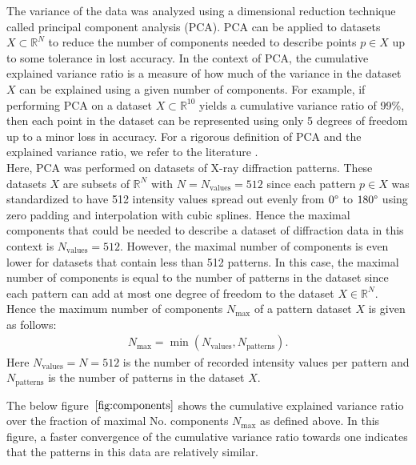 The variance of the data was analyzed using a dimensional reduction technique called principal component analysis (PCA). PCA can be applied to datasets $X \subset \mathbb{R}^N$ to reduce the number of components needed to describe points $p \in X$ up to some tolerance in lost accuracy. In the context of PCA, the cumulative explained variance ratio is a measure of how much of the variance in the dataset $X$ can be explained using a given number of components. For example, if performing PCA on a dataset $X \subset \mathbb{R}^{10}$ yields a cumulative variance ratio of 99\%, then each point in the dataset can be represented using only 5 degrees of freedom up to a minor loss in accuracy. For a rigorous definition of PCA and the explained variance ratio, we refer to the literature \cite{Jolliffe2016}. \\

Here, PCA was performed on datasets of X-ray diffraction patterns. These datasets $X$ are subsets of $\mathbb{R}^{N}$ with $N=N_{\text{values}} =512$ since each pattern $p \in X$ was standardized to have 512 intensity values spread out evenly from $0\degree$ to $180\degree$ using zero padding and interpolation with cubic splines. Hence the maximal components that could be needed to describe a dataset of diffraction data in this context is $N_{\text{values}}=512$. However, the maximal number of components is even lower for datasets that contain less than 512 patterns. In this case, the maximal number of components is equal to the number of patterns in the dataset since each pattern can add at most one degree of freedom to the dataset $X \in \mathbb{R}^N$. Hence the maximum number of components $N_{\text{max}}$ of a pattern dataset $X$ is given as follows:
\begin{align}
    N_{\text{max}} = \min(N_{\text{values}}, N_{\text{patterns}}).
\end{align}
Here $N_{\text{values}} = N =512$ is the number of recorded intensity values per pattern and $N_{\text{patterns}}$ is the number of patterns in the dataset $X$.

\pagebreak

The below figure~$\eqref{fig:components}$ shows the cumulative explained variance ratio over the fraction of maximal No. components $N_{\text{max}}$ as defined above. In this figure, a faster convergence of the cumulative variance ratio towards one indicates that the patterns in this data are relatively similar.

